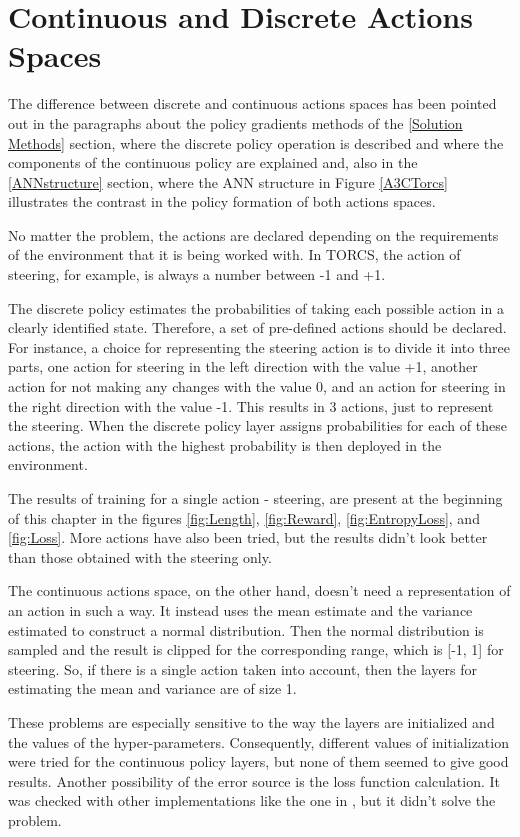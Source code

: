 \section{Continuous and Discrete Actions Spaces}
The difference between discrete and continuous actions spaces has been pointed out in the paragraphs about the policy gradients methods of the \ref{Solution Methods} section, where the discrete policy operation is described and where the components of the continuous policy are explained and, also in the \ref{ANNstructure} section, where the ANN structure in Figure \ref{A3CTorcs} illustrates the contrast in the policy formation of both actions spaces.

No matter the problem, the actions are declared depending on the requirements of the environment that it is being worked with. In TORCS, the action of steering, for example, is always a number between -1 and +1.

The discrete policy estimates the probabilities of taking each possible action in a clearly identified state. Therefore, a set of pre-defined actions should be declared. For instance, a choice for representing the steering action is to divide it into three parts, one action for steering in the left direction with the value +1, another action for not making any changes with the value 0, and an action for steering in the right direction with the value -1. This results in 3 actions, just to represent the steering. When the discrete policy layer assigns probabilities for each of these actions, the action with the highest probability is then deployed in the environment.

The results of training for a single action - steering, are present at the beginning of this chapter in the figures \ref{fig:Length}, \ref{fig:Reward}, \ref{fig:EntropyLoss}, and \ref{fig:Loss}. More actions have also been tried, but the results didn't look better than those obtained with the steering only.

The continuous actions space, on the other hand, doesn't need a representation of an action in such a way. It instead uses the mean estimate and the variance estimated to construct a normal distribution. Then the normal distribution is sampled and the result is clipped for the corresponding range, which is [-1, 1] for steering. So, if there is a single action taken into account, then the layers for estimating the mean and variance are of size 1.

These problems are especially sensitive to the way the layers are initialized and the values of the hyper-parameters. Consequently, different values of initialization were tried for the continuous policy layers, but none of them seemed to give good results. Another possibility of the error source is the loss function calculation. It was checked with other implementations like the one in \cite{A3CLoss}, but it didn't solve the problem.


